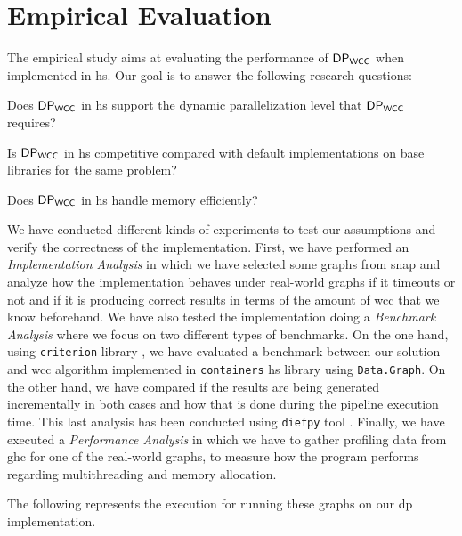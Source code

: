   



\section{Empirical Evaluation}
The empirical study aims at evaluating the performance of $\mathsf{DP_{WCC}}$ when implemented in \acrshort{hs}. 
Our goal is to answer the following research questions: 

\begin{inparaenum}[\bf {\bf RQ}1\upshape)]
\label{res:question}
    \item Does $\mathsf{DP_{WCC}}$ in \acrshort{hs} support the dynamic parallelization level that $\mathsf{DP_{WCC}}$ requires?
    \item Is $\mathsf{DP_{WCC}}$ in \acrshort{hs} competitive compared with default implementations on base libraries for the same problem?
    \item Does $\mathsf{DP_{WCC}}$ in \acrshort{hs} handle memory efficiently?
\end{inparaenum}

We have conducted different kinds of experiments to test our assumptions and verify the correctness of the implementation.
First, we have performed an \emph{Implementation Analysis} in which we have selected some graphs from \acrfull{snap} \cite{stanford} 
and analyze how the implementation behaves under real-world graphs if it timeouts or not and if it is producing correct results in terms of the amount of \acrshort{wcc} that we know beforehand.
We have also tested the implementation doing a \emph{Benchmark Analysis} where we focus on two different types of benchmarks. On the one hand, 
using \texttt{criterion} library \cite{criterion}, we have evaluated a benchmark between our solution and \acrshort{wcc} algorithm implemented in \texttt{containers} \acrshort{hs} library \cite{containers} 
using \texttt{Data.Graph}. On the other hand, we have compared if the results are being generated incrementally in both cases and how that is done during the pipeline execution time. 
This last analysis has been conducted using \texttt{diefpy} tool \cite{diefpaper,diefpy}.
Finally, we have executed a \textit{Performance Analysis} in which we have to gather profiling data from \acrfull{ghc} for one of the real-world graphs, to measure how the program performs 
regarding multithreading and memory allocation.

The following represents the execution for running these graphs on our \acrshort{dp} implementation.

